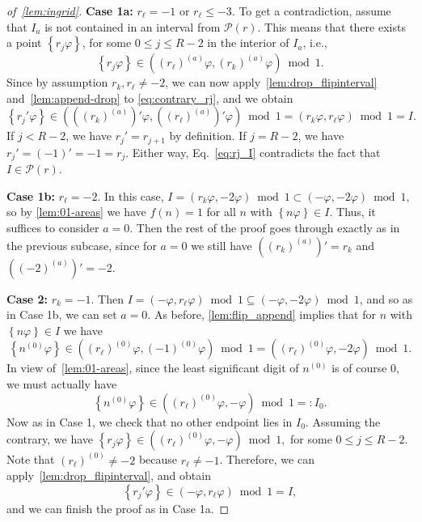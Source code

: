 \documentclass[12pt,runningheads]{llncs}
\newcommand{\cP}{\mathcal{P}}
\renewcommand{\phi}{\varphi}
\newcommand{\fract}[1]{\left\{ #1 \right\}}
\newcommand{\nzero}{n^{(0)}}
\newcommand{\append}[2]{#1^{(#2)}}
\newcommand{\caseI}[1]{\medskip\noindent\textbf{Case #1:}}
\newcommand{\caseII}[1]{\textbf{Case #1:}}
\begin{document}
\begin{proof}[of~\cref{lem:ingrid}]
\caseII{1a} $r_\ell=-1$ or $r_\ell \leq -3$. 
To get a contradiction, assume that $I_a$ is not contained in an interval from $\cP(r)$. This means that there exists a point $\fract{r_j\phi}$, for some $0\leq j \leq R-2$ in the interior of $I_a$, i.e., 
\begin{equation}\label{eq:contrary_rj}
    \fract{r_j\phi} \in (\append{(r_\ell)}{a} \phi, \append{(r_k)}{a} \phi) \bmod 1.
\end{equation}
Since by assumption $r_k,r_\ell \neq -2$, we can now apply~\cref{lem:drop_flipinterval} and~\cref{lem:append-drop} to \eqref{eq:contrary_rj}, 
and we obtain
\begin{equation}\label{eq:rj_I}
    \fract{r_j'\phi} 
    \in \left(
        (\append{(r_k)}{a})'\phi,
        (\append{(r_\ell)}{a})' \phi
        \right) \bmod 1
    =(r_k \phi, r_\ell \phi) \bmod 1 
    = I.
\end{equation}
If $j < R-2$, we have $r_j' = r_{j+1}$ by definition. If $j = R-2$, we have $r_j' = (-1)' = -1 = r_j$.
Either way, Eq.~\eqref{eq:rj_I} contradicts the fact that $I \in \cP(r)$.

\caseII{1b} $r_\ell=-2$. In this case, $I=(r_k\phi,-2\phi)\bmod 1\subset (-\phi,-2\phi)\bmod 1$, so by \cref{lem:01-areas} we have $f(n)=1$ for all $n$ with $\fract{n\phi} \in I$. Thus, it suffices to consider $a=0$. Then the rest of the proof goes through exactly as in the previous subcase, since for $a=0$ we still have $(\append{(r_k)}{a})' = r_k$ and $(\append{(-2)}{a})' = -2$.

    
\caseI{2} $r_k=-1$. Then $I=(-\phi,r_\ell\phi) \bmod 1\subseteq (-\phi,-2\phi)\bmod 1$, and so as in Case 1b, we can set $a=0$. 
As before, \cref{lem:flip_append} implies that for $n$ with $\fract{n\phi} \in I$ we have
\[
    \fract{\nzero\phi} \in (\append{(r_\ell)}{0} \phi, \append{(-1)}{0} \phi) \bmod 1= (\append{(r_\ell)}{0} \phi, -2 \phi)\bmod 1.
\]
In view of~\cref{lem:01-areas}, since the least significant digit of $\nzero$ is of course $0$, we must actually have
\[
    \fract{\nzero\phi} \in \left(\append{(r_\ell)}{0} \phi, -\phi\right) \bmod 1=: I_0.
\] 
Now as in Case 1, we check that no other endpoint lies in $I_0$.
Assuming the contrary, we have $\fract{r_j \phi} \in (\append{(r_\ell)}{0} \phi, - \phi) \bmod 1,$  for some $0\leq j\leq R-2$.
Note that $\append{(r_\ell)}{0} \neq -2$ because $r_\ell \neq -1$.
Therefore, we can apply~\cref{lem:drop_flipinterval}, and obtain
\[
    \fract{r_j'\phi} \in (-\phi, r_\ell \phi) \bmod 1= I,
\]
and we can finish the proof as in Case 1a.


\end{proof}
\end{document}
